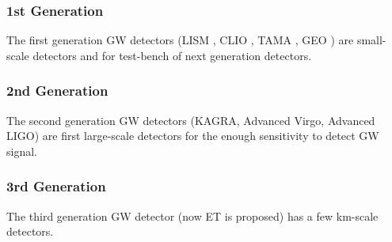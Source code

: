 \subsubsection{1st Generation}
The first generation GW detectors (LISM \cite{sato2004ultrastable}, CLIO \cite{ohashi2003design}, TAMA \cite{ando2001stable}, GEO \cite{grote2010geo}) are small-scale detectors and for test-bench of next generation detectors.

\subsubsection{2nd Generation}
The second generation GW detectors (KAGRA\cite{akutsu2018kagra}, Advanced Virgo\cite{acernese2014advanced}, Advanced LIGO\cite{aasi2015advanced}) are first large-scale detectors for the enough sensitivity to detect GW signal.

\subsubsection{3rd Generation}
The third generation GW detector (now ET is proposed) has a few km-scale detectors.



